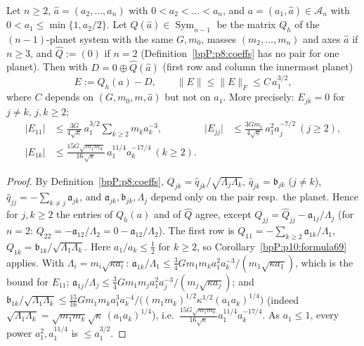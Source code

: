 \begin{lemma}\label{bpP:p10:peel}
Let $n\ge2$, $\hat a=(a_2,\dots,a_n)$ with $0<a_2<\dots<a_n$, and $a=(a_1,\hat a)\in\mathcal A_n$ with $0<a_1\le\min\{1,a_2/2\}$. Let $\hat Q(\hat a)\in\operatorname{Sym}_{n-1}$ be the matrix $Q_h$ of the $(n-1)$-planet system with the same $G,m_0$, masses $(m_2,\dots,m_n)$ and axes $\hat a$ if $n\ge3$, and $\hat Q:=(0)$ if $n=2$ (Definition~\ref{bpP:p8:coeffs} has no pair for one planet). Then with $D=0\oplus\hat Q(\hat a)$ (first row and column the innermost planet)
\[E:=Q_h(a)-D,\qquad\lVert E\rVert\le\lVert E\rVert_F\le C\,a_1^{3/2},\]
where $C$ depends on $(G,m_0,m,\hat a)$ but not on $a_1$. More precisely: $E_{jk}=0$ for $j\ne k$, $j,k\ge2$;
\begin{align*}\lvert E_{11}\rvert&\le\frac{3G}{4\sqrt\kappa}\,a_1^{3/2}\sum_{k\ge2}m_ka_k^{-3},&\lvert E_{jj}\rvert&\le\frac{3Gm_1}{4\sqrt\kappa}\,a_1^2a_j^{-7/2}\ (j\ge2),\\
\lvert E_{1k}\rvert&\le\frac{15G\sqrt{m_1m_k}}{16\,\sqrt\kappa}\,a_1^{11/4}a_k^{-17/4}\ (k\ge2).\end{align*}
\end{lemma}
\begin{proof}
\label{stepP:p10:peel-ent} By Definition~\ref{bpP:p8:coeffs}, $Q_{jk}=\hat q_{jk}/\sqrt{\Lambda_j\Lambda_k}$, $\hat q_{jk}=\mathfrak b_{jk}$ ($j\ne k$), $\hat q_{jj}=-\sum_{k\ne j}\mathfrak a_{jk}$, and $\mathfrak a_{jk},\mathfrak b_{jk},\Lambda_j$ depend only on the pair resp.\ the planet. Hence for $j,k\ge2$ the entries of $Q_h(a)$ and of $\hat Q$ agree, except $Q_{jj}=\hat Q_{jj}-\mathfrak a_{1j}/\Lambda_j$ (for $n=2$: $Q_{22}=-\mathfrak a_{12}/\Lambda_2=0-\mathfrak a_{12}/\Lambda_2$). The first row is $Q_{11}=-\sum_{k\ge2}\mathfrak a_{1k}/\Lambda_1$, $Q_{1k}=\mathfrak b_{1k}/\sqrt{\Lambda_1\Lambda_k}$.
\label{stepP:p10:peel-bd} Here $a_1/a_k\le\frac12$ for $k\ge2$, so Corollary~\ref{bpP:p10:formula69} applies. With $\Lambda_i=m_i\sqrt{\kappa a_i}$: $\mathfrak a_{1k}/\Lambda_1\le\frac34Gm_1m_ka_1^2a_k^{-3}/(m_1\sqrt{\kappa a_1})$, which is the bound for $E_{11}$; $\mathfrak a_{1j}/\Lambda_j\le\frac34Gm_1m_ja_1^2a_j^{-3}/(m_j\sqrt{\kappa a_j})$; and $\mathfrak b_{1k}/\sqrt{\Lambda_1\Lambda_k}\le\frac{15}{16}Gm_1m_ka_1^3a_k^{-4}/\big((m_1m_k)^{1/2}\kappa^{1/2}(a_1a_k)^{1/4}\big)$ (indeed $\sqrt{\Lambda_1\Lambda_k}=\sqrt{m_1m_k}\sqrt\kappa\,(a_1a_k)^{1/4}$), i.e.\ $\frac{15G\sqrt{m_1m_k}}{16\sqrt\kappa}a_1^{11/4}a_k^{-17/4}$. As $a_1\le1$, every power $a_1^{2},a_1^{11/4}$ is $\le a_1^{3/2}$.
\end{proof}

